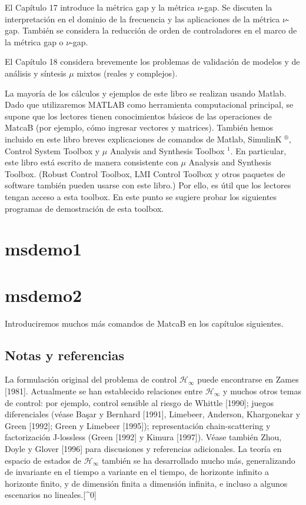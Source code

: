 \documentclass[11pt]{article}
\begin{document}
El Capítulo 17 introduce la métrica gap y la métrica $\nu$-gap. Se discuten la interpretación en el dominio de la frecuencia y las aplicaciones de la métrica $\nu$-gap. También se considera la reducción de orden de controladores en el marco de la métrica gap o $\nu$-gap.

El Capítulo 18 considera brevemente los problemas de validación de modelos y de análisis y síntesis $\mu$ mixtos (reales y complejos).

La mayoría de los cálculos y ejemplos de este libro se realizan usando Matlab. Dado que utilizaremos MATLAB como herramienta computacional principal, se supone que los lectores tienen conocimientos básicos de las operaciones de MatcaB (por ejemplo, cómo ingresar vectores y matrices). También hemos incluido en este libro breves explicaciones de comandos de Matlab, SimulinK ${ }^{\circledR}$, Control System Toolbox y $\mu$ Analysis and Synthesis Toolbox ${ }^{1}$. En particular, este libro está escrito de manera consistente con $\mu$ Analysis and Synthesis Toolbox. (Robust Control Toolbox, LMI Control Toolbox y otros paquetes de software también pueden usarse con este libro.) Por ello, es útil que los lectores tengan acceso a esta toolbox. En este punto se sugiere probar los siguientes programas de demostración de esta toolbox.

\section*{msdemo1}

\section*{msdemo2}
Introduciremos muchos más comandos de MatcaB en los capítulos siguientes.

\subsection*{Notas y referencias}
La formulación original del problema de control $\mathcal{H}_{\infty}$ puede encontrarse en Zames [1981]. Actualmente se han establecido relaciones entre $\mathcal{H}_{\infty}$ y muchos otros temas de control: por ejemplo, control sensible al riesgo de Whittle [1990]; juegos diferenciales (véase Başar y Bernhard [1991], Limebeer, Anderson, Khargonekar y Green [1992]; Green y Limebeer [1995]); representación chain-scattering y factorización J-lossless (Green [1992] y Kimura [1997]). Véase también Zhou, Doyle y Glover [1996] para discusiones y referencias adicionales. La teoría en espacio de estados de $\mathcal{H}_{\infty}$ también se ha desarrollado mucho más, generalizando de invariante en el tiempo a variante en el tiempo, de horizonte infinito a horizonte finito, y de dimensión finita a dimensión infinita, e incluso a algunos escenarios no lineales.[\^{}0]
\end{document}
